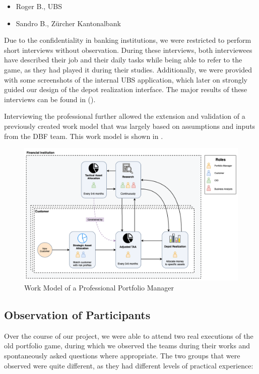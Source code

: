 \begin{itemize}
  \item Roger B., UBS
  \item Sandro B., Zürcher Kantonalbank
\end{itemize}

Due to the confidentiality in banking institutions, we were restricted to perform short interviews without observation. During these interviews, both interviewees have described their job and their daily tasks while being able to refer to the game, as they had played it during their studies. Additionally, we were provided with some screenshots of the internal UBS application, which later on strongly guided our design of the depot realization interface. The major results of these interviews can be found in ().

Interviewing the professional further allowed the extension and validation of a previously created work model that was largely based on assumptions and inputs from the DBF team. This work model is shown in .

\begin{figure}[h!]
  \centering
  \includegraphics[scale=0.35]{img/work_model_process.png}
  \caption{Work Model of a Professional Portfolio Manager}
  \label{fig:work_model_professional}
\end{figure}


\subsection{Observation of Participants}
Over the course of our project, we were able to attend two real executions of the old portfolio game, during which we observed the teams during their works and spontaneously asked questions where appropriate. The two groups that were observed were quite different, as they had different levels of practical experience:

